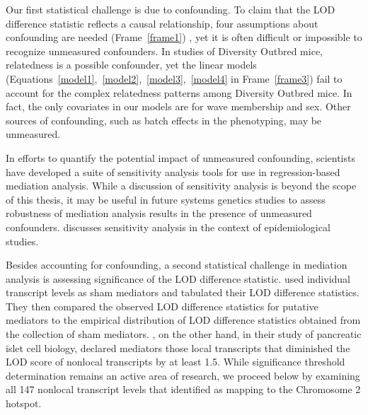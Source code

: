 \documentclass[oneside]{book}\usepackage[]{graphicx}\usepackage[]{color}
\begin{document}
Our first statistical challenge is due to confounding. To claim that the LOD difference statistic reflects a causal relationship, four assumptions about confounding are needed (Frame~\ref{frame1}) \citep{vanderweele2015explanation}, yet
it is often difficult or impossible to recognize unmeasured confounders. 
In studies of Diversity Outbred mice, relatedness is a possible confounder, 
yet the linear models (Equations~\ref{model1},~\ref{model2},~\ref{model3},~\ref{model4}
in Frame~\ref{frame3}) fail to account for the complex relatedness patterns 
among Diversity Outbred mice. 
In fact, the only covariates in our models are for wave membership and sex. 
Other sources of confounding, such as batch effects in the phenotyping, may be unmeasured.

In efforts to quantify the potential impact of unmeasured confounding, scientists have 
developed a suite of sensitivity analysis tools for use in regression-based mediation analysis.
While a discussion of sensitivity analysis is beyond the scope of this thesis, 
it may be useful in future systems genetics studies to assess robustness of mediation analysis
results in the presence of unmeasured confounders. 
\citet{vanderweele2015explanation} discusses sensitivity analysis in the context of epidemiological studies. 








Besides accounting for confounding, a second statistical challenge in mediation analysis is assessing significance of the LOD difference statistic. 
\citet{chick2016defining} used individual transcript levels as sham mediators and tabulated their LOD difference statistics. 
They then compared the observed LOD difference statistics for putative mediators to the empirical distribution of LOD difference statistics obtained from the collection of sham mediators. 
\citet{keller2018genetic}, on the other hand, in their study of pancreatic islet 
cell biology, declared mediators those local transcripts that diminished the LOD score 
of nonlocal transcripts by at least 1.5. 
While significance threshold determination remains an active area of research, 
we proceed below by examining all 147 nonlocal transcript levels that 
\citet{keller2018genetic} identified as mapping to the Chromosome 2 hotspot.
\end{document}
